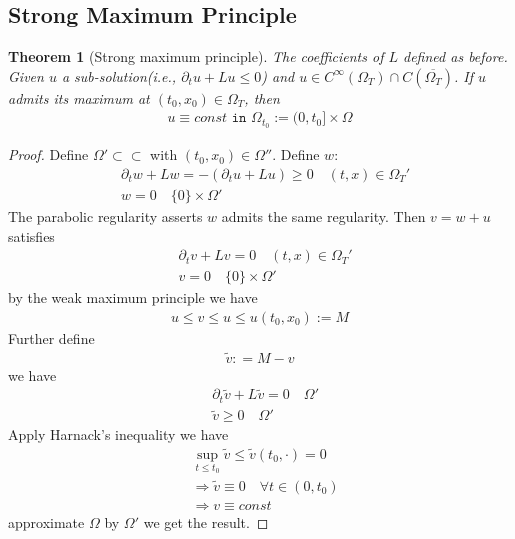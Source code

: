 \documentclass[a4paper,11pt,oneside,fleqn]{book}
\newtheorem{theorem}{Theorem}[section]
\theoremstyle{definition}
\theoremstyle{remark}
\begin{document}
\subsection{Strong Maximum Principle}
\begin{theorem}[Strong maximum principle]
The coefficients of $L$ defined as before. 
Given $u$ a sub-solution(i.e., $\partial_t u + L u \le 0$) and $u \in C^\infty(\Omega_T) \cap C(\overline{\Omega_T})$. If $u$ admits its maximum at $(t_0, x_0) \in \Omega_T$, then 
\begin{align*}
	u \equiv const \texttt{ in } \Omega_{t_0}:= (0, t_0] \times \Omega
\end{align*}
\end{theorem}
\begin{proof}
Define $\Omega' \subset\subset$ with $(t_0, x_0) \in \Omega''$.
	Define $w$: 
	\begin{align*}
		&\partial_t w + Lw = -(\partial_t u + L u) \ge 0 \quad (t, x) \in \Omega_T'\\
		& w = 0 \quad \{0\} \times \Omega'
	\end{align*}
	The parabolic regularity asserts $w$ admits the same regularity. Then $v = w + u$ satisfies
	\begin{align*}
		& \partial_t v + Lv = 0 \quad (t, x) \in \Omega_T'\\
		& v = 0 \quad \{0\} \times \Omega'
	\end{align*}
	by the weak maximum principle we have
	\begin{align*}
		u \le v \le u \le u(t_0, x_0) := M
	\end{align*}
	Further define
	\begin{align*}
		\tilde{v}: = M - v
	\end{align*}
	we have
	\begin{align*}
		&\partial_t \tilde{v} + L\tilde{v} = 0 \quad \Omega' \\
		&\tilde{v} \ge 0 \quad \Omega'
	\end{align*}
	Apply Harnack's inequality we have
	\begin{align*}
		&\sup_{t \le t_0} \tilde{v} \le \tilde{v}(t_0, \cdot) = 0\\
		&\Rightarrow \tilde{v} \equiv 0 \quad \forall t \in (0, t_0)\\
		&\Rightarrow v \equiv const
	\end{align*}
	approximate $\Omega$ by $\Omega'$ we get the result. 
\end{proof}
 
 
\end{document}
